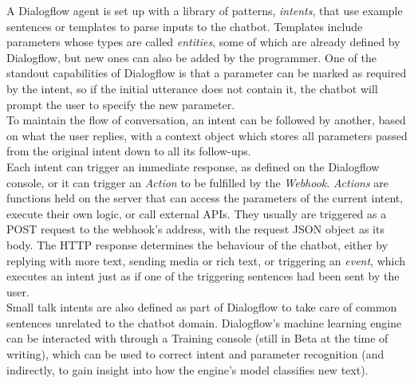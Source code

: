 A Dialogflow agent is set up with a library of patterns, \textit{intents}, that use example sentences or templates to parse inputs to the chatbot. Templates include parameters whose types are called \textit{entities}, some of which are already defined by Dialogflow, but new ones can also be added by the programmer. One of the standout capabilities of Dialogflow is that a parameter can be marked as required by the intent, so if the initial utterance does not contain it, the chatbot will prompt the user to specify the new parameter. \\
To maintain the flow of conversation, an intent can be followed by another, based on what the user replies, with a context object which stores all parameters passed from the original intent down to all its follow-ups. \\
Each intent can trigger an immediate response, as defined on the Dialogflow console, or it can trigger an \textit{Action} to be fulfilled by the \textit{Webhook}. \textit{Actions} are functions held on the server that can access the parameters of the current intent, execute their own logic, or call external APIs. They usually are triggered as a POST request to the webhook's address, with the request JSON object as its body. The HTTP response determines the behaviour of the chatbot, either by replying with more text, sending media or rich text, or triggering an \textit{event}, which executes an intent just as if one of the triggering sentences had been sent by the user. \\
Small talk intents are also defined as part of Dialogflow to take care of common sentences unrelated to the chatbot domain. Dialogflow's machine learning engine can be interacted with through a Training console (still in Beta at the time of writing), which can be used to correct intent and parameter recognition (and indirectly, to gain insight into how the engine's model classifies new text).

